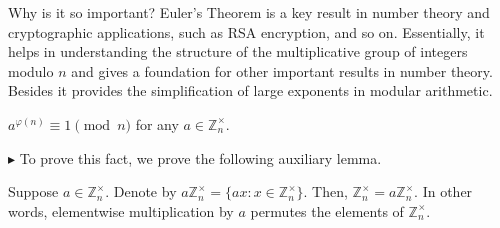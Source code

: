 \documentclass[../../book.tex]{subfiles}
\begin{document}
Why is it so important? Euler's Theorem is a key result in number theory and 
cryptographic applications, such as RSA encryption, and so on. 
Essentially, it helps in understanding the structure of the multiplicative group of 
integers modulo $n$ and gives a foundation for other important results in number theory. 
Besides it provides the simplification of large exponents in modular arithmetic. 

\begin{theorem}[Euler's] \label{th:euler_theorem}
    $a^{\varphi(n)} \equiv 1 \pmod{n}$ for any $a \in \mathbb{Z}_n^{\times}$.
\end{theorem}

$\blacktriangleright$ To prove this fact, we prove the following auxiliary lemma.

\begin{lemma}
    Suppose $a \in \mathbb{Z}_n^{\times}$. Denote by $a\mathbb{Z}_n^{\times} =
    \{ax: x \in \mathbb{Z}_n^{\times}\}$. Then, $\mathbb{Z}_n^{\times} =
    a\mathbb{Z}_n^{\times}$. In other words, elementwise multiplication by $a$
    permutes the elements of $\mathbb{Z}_n^{\times}$.
\end{lemma}
\end{document}
